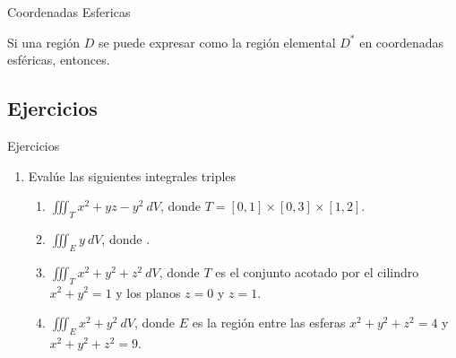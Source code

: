 \begin{frame}{Coordenadas Esfericas}
  \vspace{-5mm}
  \begin{thm}
    Si una región $D$ se puede expresar como la región elemental $D^*$ en coordenadas esféricas, entonces.\\
    \vspace{5mm}
  \end{thm}
\end{frame}

\subsection{Ejercicios}
\begin{frame}
\subsectionpage
\end{frame}


\begin{frame}{Ejercicios}
  \begin{enumerate}
    \item Evalúe las siguientes integrales triples
    \begin{enumerate}
      \item $\displaystyle\iiint_{T} x^2+yz-y^2\ dV$, donde $T=[0,1]\times[0,3]\times[1,2]$.\\[0.25cm]
      \item $\displaystyle\iiint_{E} y\ dV$, donde 
      .\\[0.25cm]
      \item $\displaystyle\iiint_{T} x^2+y^2+z^2\ dV$, donde $T$ es el conjunto acotado por el cilindro $x^2+y^2=1$ y los planos $z=0$ y $z=1$.\\[0.25cm]
      \item $\displaystyle\iiint_{E} x^2+y^2\ dV$, donde $E$ es la región entre las esferas $x^2+y^2+z^2=4$ y $x^2+y^2+z^2=9$. 
    \end{enumerate}
  \end{enumerate}
\end{frame}


